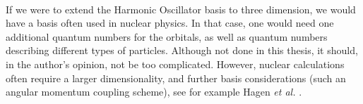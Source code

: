 \paragraph{}
If we were to extend the Harmonic Oscillator basis to three dimension, we would have a basis often used in nuclear physics. 
In that case, one would need one additional quantum numbers for the orbitals, as well as quantum numbers describing different types of particles.
Although not done in this thesis, it should, in the author's opinion, not be too complicated.
However, nuclear calculations often require a larger dimensionality, and further basis considerations (such an angular momentum coupling scheme), see for example
Hagen {\em et al.} \cite{hagen2010}.




